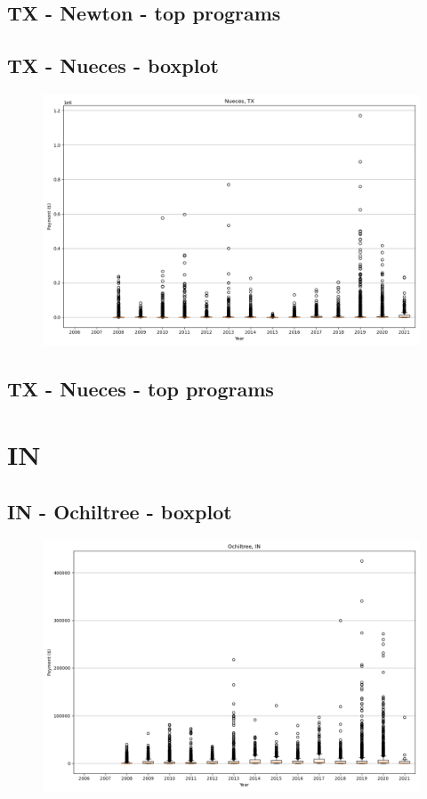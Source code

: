 \subsection*{TX - Newton - top programs}

\newpage
\subsection*{TX - Nueces - boxplot}
\begin{figure}[h]
\centering
\includegraphics[width=7in]{../output/boxplots/counties/Nueces-TX_boxplot.png}
\end{figure}


\subsection*{TX - Nueces - top programs}

\newpage
\section*{IN}
\subsection*{IN - Ochiltree - boxplot}
\begin{figure}[h]
\centering
\includegraphics[width=7in]{../output/boxplots/counties/Ochiltree-IN_boxplot.png}
\end{figure}


